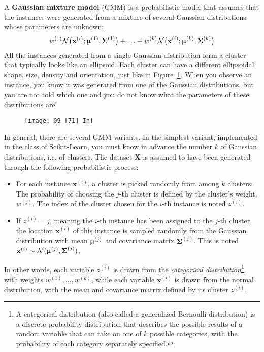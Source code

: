 A \textbf{Gaussian mixture model} (GMM) is a probabilistic model that assumes that the instances were generated from a mixture of several Gaussian distributions whose parameters are unknown:
\begin{equation}
w^{(1)}\mathcal{N}\bigl(\mathbf{x}^{(i)};\boldsymbol{\upmu}^{(1)},\boldsymbol{\Sigma}^{(1)}\bigr)+\ldots+w^{(k)}\mathcal{N}\bigl(\mathbf{x}^{(i)};\boldsymbol{\upmu}^{(k)},\boldsymbol{\Sigma}^{(k)}\bigr)
\end{equation}
All the instances generated from a single Gaussian distribution form a cluster that typically looks like an ellipsoid. Each cluster can have a different ellipsoidal shape, size, density and orientation, just like in Figure~\ref{09_[71]_In}. When you observe an instance, you know it was generated from one of the Gaussian distributions, but you are not told which one and you do not know what the parameters of these distributions are!
\begin{figure}[h!t]
\centering
\texttt{[image: 09\_[71]\_In]}
\caption{}\label{09_[71]_In}
\end{figure}

In general, there are several GMM variants. In the simplest variant, implemented in the  class of Scikit-Learn, you must know in advance the number $k$ of Gaussian distributions, i.e. of clusters. The dataset $\mathbf{X}$ is assumed to have been generated through the following probabilistic process:
\begin{itemize}
\item For each instance $\mathbf{x}^{(i)}$, a cluster is picked randomly from among $k$ clusters. The probability of choosing the $j$-th cluster is defined by the cluster's weight, $w^{(j)}$. The index of the cluster chosen for the $i$-th instance is noted $z^{(i)}$.
\item If $z^{(i)}=j$, meaning the $i$-th instance has been assigned to the $j$-th cluster, the location $\mathbf{x}^{(i)}$ of this instance is sampled randomly from the Gaussian distribution with mean $\boldsymbol{\upmu}^{(j)}$ and covariance matrix $\boldsymbol{\Sigma}^{(j)}$. This is noted $\mathbf{x}^{(i)}\sim\mathcal{N}(\boldsymbol{\upmu}^{(j)},\boldsymbol{\Sigma}^{(j)})$.
\end{itemize}
In other words, each variable $z^{(i)}$ is drawn from the \emph{categorical distribution}\footnote{A categorical distribution (also called a generalized Bernoulli distribution) is a discrete probability distribution that describes the possible results of a random variable that can take on one of $k$ possible categories, with the probability of each category separately specified.} with weights $w^{(1)},\ldots,w^{(k)}$, while each variable $\mathbf{x}^{(i)}$ is drawn from the normal distribution, with the mean and covariance matrix defined by its cluster $z^{(i)}$.


